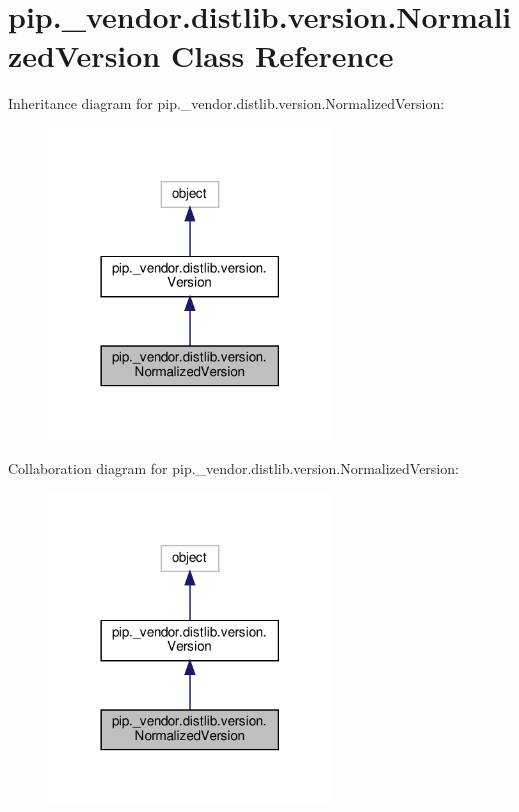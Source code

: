 \hypertarget{classpip_1_1__vendor_1_1distlib_1_1version_1_1NormalizedVersion}{}\section{pip.\+\_\+vendor.\+distlib.\+version.\+Normalized\+Version Class Reference}
\label{classpip_1_1__vendor_1_1distlib_1_1version_1_1NormalizedVersion}


Inheritance diagram for pip.\+\_\+vendor.\+distlib.\+version.\+Normalized\+Version\+:
\nopagebreak
\begin{figure}[H]
\begin{center}
\leavevmode
\includegraphics[width=213pt]{classpip_1_1__vendor_1_1distlib_1_1version_1_1NormalizedVersion__inherit__graph}
\end{center}
\end{figure}


Collaboration diagram for pip.\+\_\+vendor.\+distlib.\+version.\+Normalized\+Version\+:
\nopagebreak
\begin{figure}[H]
\begin{center}
\leavevmode
\includegraphics[width=213pt]{classpip_1_1__vendor_1_1distlib_1_1version_1_1NormalizedVersion__coll__graph}
\end{center}
\end{figure}
